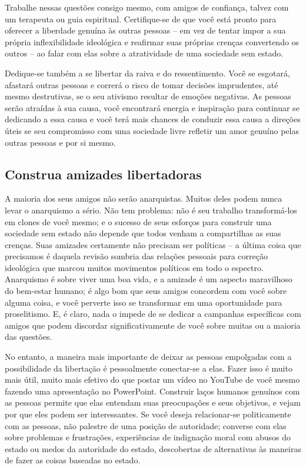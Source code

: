 Trabalhe nessas questões consigo mesmo, com amigos de confiança, talvez com um terapeuta ou guia espiritual. Certifique-se de que você está pronto para oferecer a liberdade genuína às outras pessoas -- em vez de tentar impor a sua própria inflexibilidade ideológica e reafirmar suas próprias crenças convertendo os outros -- ao falar com elas sobre a atratividade de uma sociedade sem estado.

Dedique-se também a se libertar da raiva e do ressentimento. Você se esgotará, afastará outras pessoas e correrá o risco de tomar decisões imprudentes, até mesmo destrutivas, se o seu ativismo resultar de emoções negativas. As pessoas serão atraídas à sua causa, você encontrará energia e inspiração para continuar se dedicando a essa causa e você terá mais chances de conduzir essa causa a direções úteis se seu compromisso com uma sociedade livre refletir um amor genuíno pelas outras pessoas e por si mesmo.

\subsection*{Construa amizades libertadoras}

A maioria dos seus amigos não serão anarquistas. Muitos deles podem nunca levar o anarquismo a sério. Não tem problema: não é seu trabalho transformá-los em clones de você mesmo; e o sucesso de seus esforços para construir uma sociedade sem estado não depende que todos venham a compartilhas as suas crenças. Suas amizades certamente não precisam ser políticas -- a última coisa que precisamos é daquela revisão sombria das relações pessoais para correção ideológica que marcou muitos movimentos políticos em todo o espectro. Anarquismo é sobre viver uma boa vida, e a amizade é um aspecto maravilhoso do bem-estar humano; é algo bom que seus amigos concordem com você sobre alguma coisa, e você perverte isso se transformar em uma oportunidade para proselitismo. E, é claro, nada o impede de se dedicar a campanhas específicas com amigos que podem discordar significativamente de você sobre muitas ou a maioria das questões.

No entanto, a maneira mais importante de deixar as pessoas empolgadas com a possibilidade da libertação é pessoalmente conectar-se a elas. Fazer isso é muito mais útil, muito mais efetivo do que postar um vídeo no YouTube de você mesmo fazendo uma apresentação no PowerPoint. Construir laços humanos genuínos com as pessoas permite que elas entendam suas preocupações e seus objetivos, e vejam por que eles podem ser interessantes. Se você deseja relacionar-se politicamente com as pessoas, não palestre de uma posição de autoridade; converse com elas sobre problemas e frustrações, experiências de indignação moral com abusos do estado ou medos da autoridade do estado, descobertas de alternativas às maneiras de fazer as coisas baseadas no estado.

